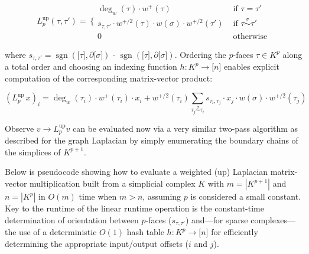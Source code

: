\[L_{p}^{\operatorname{up}}(\tau,\tau') = \left. \ \{\begin{array}{ll}
\deg_{w}(\tau) \cdot w^{+}(\tau) & \text{ if }\tau = \tau' \\
s_{\tau,\tau'} \cdot w^{+ /2}(\tau) \cdot w(\sigma) \cdot w^{+ /2}(\tau') & \text{ if }\tau\overset{\sigma}{\sim}\tau' \\
0 & \text{ otherwise}
\end{array} \right.\]

where \(s_{\tau,\tau'} = \operatorname{sgn}\left. \left( \left. \lbrack\tau\rbrack \right.,\partial\left. \lbrack\sigma\rbrack \right. \right) \right.\, \cdot \,\operatorname{sgn}\left. \left( \left. \lbrack\tau\rbrack \right.,\partial\left. \lbrack\sigma\rbrack \right. \right) \right.\). Ordering the \(p\)-faces \(\tau \in K^{p}\) along a total order and choosing an indexing function \(h:K^{p} \rightarrow \left. \lbrack n\rbrack \right.\) enables explicit computation of the corresponding matrix-vector product:

\[\left. \left( L_{p}^{\operatorname{up}}\, x \right) \right._{i} = \deg_{w}\left( \tau_{i} \right) \cdot w^{+}\left( \tau_{i} \right) \cdot x_{i} + w^{+ /2}\left( \tau_{i} \right)\sum_{\tau_{j}\overset{\sigma}{\sim}\tau_{i}}s_{\tau_{i},\tau_{j}} \cdot x_{j} \cdot w(\sigma) \cdot w^{+ /2}\left( \tau_{j} \right)\] \label{eq:l_up_matvec}{}

Observe \(v \rightarrow L_{p}^{\operatorname{up}}v\) can be evaluated now via a very similar two-pass algorithm as described for the graph Laplacian by simply enumerating the boundary chains of the simplices of \(K^{p + 1}\).

Below is pseudocode showing how to evaluate a weighted (up) Laplacian matrix-vector multiplication built from a simplicial complex \(K\) with \(m = \left| K^{p + 1} \right|\) and \(n = \left| K^{p} \right|\) in \(O(m)\) time when \(m > n\), assuming \(p\) is considered a small constant. Key to the runtime of the linear runtime operation is the constant-time determination of orientation between \(p\)-faces (\(s_{\tau,\tau'}\)) and---for sparse complexes---the use of a deterministic \(O(1)\) hash table \(h:K^{p} \rightarrow \left. \lbrack n\rbrack \right.\) for efficiently determining the appropriate input/output offsets (\(i\) and \(j\)).

